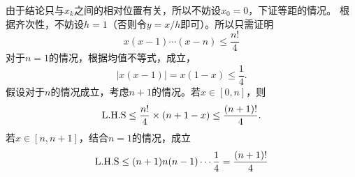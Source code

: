   由于结论只与$x_k$之间的相对位置有关，所以不妨设$x_0 = 0$，下证等距的情况。
  根据齐次性，不妨设$h = 1$（否则令$y = x / h$即可）。所以只需证明
  \[
    x(x-1)\cdots(x-n) \le \frac{n!}{4}
  \]
  对于$n=1$的情况，根据均值不等式，成立，
  \[
    |x(x-1)| = x(1-x) \le \frac{1}{4}.
  \]
  假设对于$n$的情况成立，考虑$n+1$的情况。若$x\in[0, n]$，则
  \[
    \text{L.H.S} \le \frac{n!}{4}\times(n+1-x) \le \frac{(n+1)!}{4}.
  \]
  若$x\in[n, n+1]$，结合$n=1$的情况，成立
  \[
    \text{L.H.S} \le (n+1)n(n-1)\cdots\frac{1}{4} = \frac{(n+1)!}{4}
  \]


